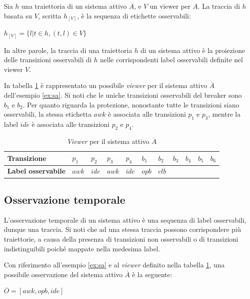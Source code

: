 \begin{defn}
Sia $h$ una traiettoria di un sistema attivo $A$, e $V$ un viewer per $A$. La traccia di $h$ basata su $V$, scritta $h_{[V]}$, è la sequenza di etichette osservabili:
\begin{center}
$h_{[V]} = \{l|t \in h, (t,l) \in V\}$
\end{center}
\end{defn}
In altre parole, la traccia di una traiettoria $h$ di un sistema attivo è la proiezione delle transizioni osservabili di $h$ nelle corrispondenti label osservabili definite nel viewer $V$.

\begin{ex}
In tabella \ref{tab:viewer} è rappresentato un possibile \emph{viewer} per il sistema attivo $\overline{A}$ dell'esempio \ref{ex:sa}. Si noti che le uniche transizioni osservabili del breaker sono $b_1$ e $b_2$. Per quanto riguarda la protezione, nonostante tutte le transizioni siano osservabili, la stessa etichetta $awk$ è associata alle transizioni $p_1$ e $p_3$, mentre la label $ide$ è associata alle transizioni $p_2$ e $p_4$. 
\end{ex}

\begin{table}[htbp] 
\begin{tabularx}{\textwidth}{l X X X X X X X X X X}
\hline
\textbf{Transizione} & $p_1$ & $p_2$ & $p_3$ & $p_4$ & $b_1$ & $b_2$ & $b_3$ & $b_4$ & $b_5$ & $b_6$\\
\hline
\textbf{Label osservabile} & $awk$ & $ide$ & $awk$ & $ide$ & $opb$ & $clb$ &  &  &  & \\
\hline
\end{tabularx}
\caption{\emph{Viewer} per il sistema attivo $\overline{A}$}
\label{tab:viewer}
\end{table}

\subsection{Osservazione temporale}
L'osservazione temporale di un sistema attivo è una sequenza di label osservabili, dunque una traccia.
Si noti che ad una stessa traccia possono corrispondere più traiettorie, a causa della presenza di transizioni non osservabili o di transizioni indistinguibili poiché mappate nella medesima label.

\begin{ex} \label{ex:oss}
Con riferimento all'esempio \ref{ex:sa} e al \emph{viewer} definito nella tabella \ref{tab:viewer}, una possibile osservazione del sistema attivo $\overline{A}$ è la seguente:
\begin{center}
$\overline{O} = [ awk, opb, ide] $
\end{center}
\end{ex}



